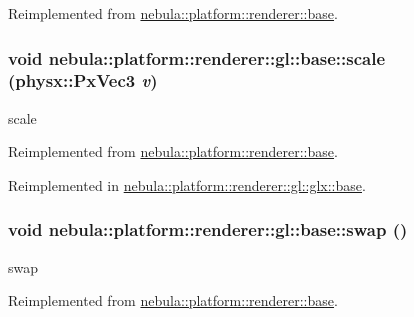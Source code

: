 Reimplemented from \hyperlink{classnebula_1_1platform_1_1renderer_1_1base_ad41ade8ed9ea4995654e06287373646c}{nebula::platform::renderer::base}.\hypertarget{classnebula_1_1platform_1_1renderer_1_1gl_1_1base_aa2cb1371b6b66b24b1d9bc8b8bbe1f90}{
\subsubsection[{scale}]{\setlength{\rightskip}{0pt plus 5cm}void nebula::platform::renderer::gl::base::scale (physx::PxVec3 {\em v})}}
\label{classnebula_1_1platform_1_1renderer_1_1gl_1_1base_aa2cb1371b6b66b24b1d9bc8b8bbe1f90}


scale 

Reimplemented from \hyperlink{classnebula_1_1platform_1_1renderer_1_1base_a7d9aa890990667e9981af855a2c58cf7}{nebula::platform::renderer::base}.

Reimplemented in \hyperlink{classnebula_1_1platform_1_1renderer_1_1gl_1_1glx_1_1base_a2d51799c14c9f17a8e5eb0900a02714d}{nebula::platform::renderer::gl::glx::base}.\hypertarget{classnebula_1_1platform_1_1renderer_1_1gl_1_1base_a99776235861491abc4fa8fc5eec7ebf9}{
\subsubsection[{swap}]{\setlength{\rightskip}{0pt plus 5cm}void nebula::platform::renderer::gl::base::swap ()}}
\label{classnebula_1_1platform_1_1renderer_1_1gl_1_1base_a99776235861491abc4fa8fc5eec7ebf9}


swap 

Reimplemented from \hyperlink{classnebula_1_1platform_1_1renderer_1_1base_a0c23f96aaae8c8fbe421bd0c734da6b9}{nebula::platform::renderer::base}.

